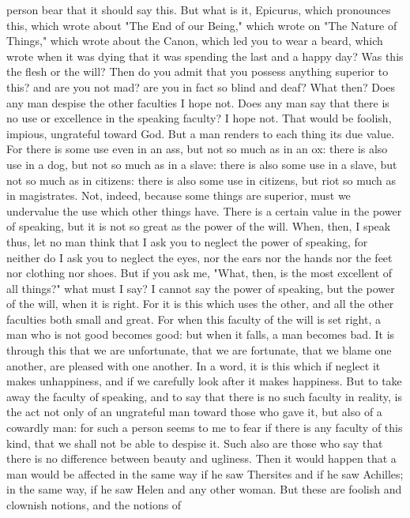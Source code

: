 \documentclass[a4paper]{article}
\begin{document}
person bear that it should say this. But what is it, Epicurus, which pronounces
this, which wrote about "The End of our Being," which wrote on "The Nature of
Things," which wrote about the Canon, which led you to wear a beard, which
wrote when it was dying that it was spending the last and a happy day? Was this
the flesh or the will? Then do you admit that you possess anything superior to
this? and are you not mad? are you in fact so blind and deaf?
    What then? Does any man despise the other faculties I hope not. Does any
man say that there is no use or excellence in the speaking faculty? I hope not.
That would be foolish, impious, ungrateful toward God. But a man renders to
each thing its due value. For there is some use even in an ass, but not so much
as in an ox: there is also use in a dog, but not so much as in a slave: there
is also some use in a slave, but not so much as in citizens: there is also some
use in citizens, but riot so much as in magistrates. Not, indeed, because some
things are superior, must we undervalue the use which other things have. There
is a certain value in the power of speaking, but it is not so great as the
power of the will. When, then, I speak thus, let no man think that I ask you to
neglect the power of speaking, for neither do I ask you to neglect the eyes,
nor the ears nor the hands nor the feet nor clothing nor shoes. But if you ask
me, "What, then, is the most excellent of all things?" what must I say? I
cannot say the power of speaking, but the power of the will, when it is right.
For it is this which uses the other, and all the other faculties both small and
great. For when this faculty of the will is set right, a man who is not good
becomes good: but when it falls, a man becomes bad. It is through this that we
are unfortunate, that we are fortunate, that we blame one another, are pleased
with one another. In a word, it is this which if neglect it makes unhappiness,
and if we carefully look after it makes happiness.
    But to take away the faculty of speaking, and to say that there is no such
faculty in reality, is the act not only of an ungrateful man toward those who
gave it, but also of a cowardly man: for such a person seems to me to fear if
there is any faculty of this kind, that we shall not be able to despise it.
Such also are those who say that there is no difference between beauty and
ugliness. Then it would happen that a man would be affected in the same way if
he saw Thersites and if he saw Achilles; in the same way, if he saw Helen and
any other woman. But these are foolish and clownish notions, and the notions of
\end{document}
